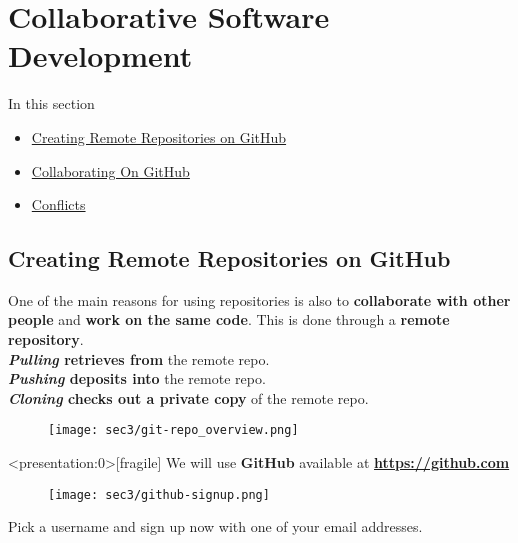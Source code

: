 \section{Collaborative Software Development}\hypertarget{sec3}{}

\begin{frame}[fragile]
\emptyframetitle
  In this section
  \begin{itemize}
    \item \hyperlink{sec3.1}{Creating Remote Repositories on GitHub}
    \item \hyperlink{sec3.2}{Collaborating On GitHub}
    \item \hyperlink{sec3.3}{Conflicts}
  \end{itemize}
\end{frame}

\subsection{Creating Remote Repositories on GitHub}\hypertarget{sec3.1}{}

\begin{frame}[fragile]
\emptyframetitle
  One of the main reasons for using repositories is also to \textbf{collaborate with other people} and \textbf{work on the same code}. This is done through a \textbf{remote repository}. \\[0.25cm]

  \textbf{\textit{Pulling} retrieves from} the remote repo.\\
  \textbf{\textit{Pushing} deposits into} the remote repo.\\
  \textbf{\textit{Cloning} checks out a private copy} of the remote repo.
  \begin{figure}[h]
    \texttt{[image: sec3/git-repo\_overview.png]}
  \end{figure}

\end{frame}

\begin{frame}<presentation:0>[fragile]
\emptyframetitle
  We will use \textbf{GitHub} available at \textbf{\url{https://github.com}}

  \begin{figure}[h]
    \texttt{[image: sec3/github-signup.png]}
  \end{figure}

  Pick a username and sign up now with one of your email addresses.

\end{frame}

